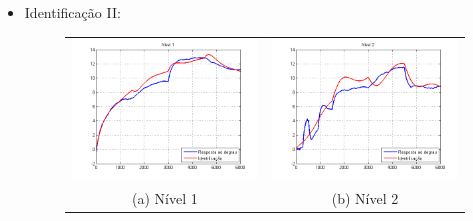 \begin{itemize}
\newpage \item Identificação II:
\begin{figure}[H]
	\centering
	\begin{tabular}{cc}
		\includegraphics[height=0.15\paperheight,keepaspectratio]{img/ident2_h1.png} &
		\includegraphics[height=0.15\paperheight,keepaspectratio]{img/ident2_h2.png} \\
		(a) Nível 1 &
		(b) Nível 2 \\

\end{tabular}
\end{figure}
\end{itemize}
